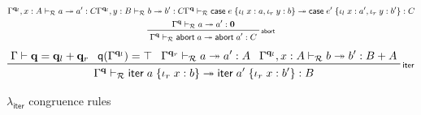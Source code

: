 \documentclass[acmsmall,screen,review]{acmart}
\newcommand{\mc}[1]{\ensuremath{\mathcal{#1}}}
\newcommand{\mb}[1]{\ensuremath{\mathbf{#1}}}
\newcommand{\ms}[1]{\ensuremath{\mathsf{#1}}}
\newcommand{\lto}{:}
\newcommand{\linl}[1]{\iota_l\;{#1}}
\newcommand{\linr}[1]{\iota_r\;{#1}}
\newcommand{\labort}[1]{\ms{abort}\;{#1}}
\newcommand{\caseexpr}[5]{\ms{case}\;#1\;\{\linl{#2} \lto #3, \linr{#4} \lto #5\}}
\newcommand{\liter}[3]{\ms{iter}\;#1\;\{ \linr{#2} \lto #3 \}}
\newcommand{\qsp}[4]{#1 \vdash #2 = #3 + #4}
\newcommand{\rle}[1]{{\scriptsize\textsf{#1}}}
\newcommand{\tref}{\twoheadrightarrow}
\newcommand{\tmle}[5]{#1 \vdash_{#2} #3 \tref #4 : {#5}}
\newcommand{\subiterexp}{\(\lambda_{\ms{iter}}\)}
\newcommand{\alquant}{\ms{q}}
\begin{document}
\begin{figure}
\begin{gather*}
      {\tmle{\Gamma^{\mb{q}_l}, x : A}{\mc{R}}{a}{a'}{C}}
      {\tmle{\Gamma^{\mb{q}_l}, y : B}{\mc{R}}{b}{b'}{C}}
      {\tmle{\Gamma^{\mb{q}}}{\mc{R}}
        {\caseexpr{e}{x}{a}{y}{b}}{\caseexpr{e'}{x}{a'}{y}{b'}}{C}} \\
    \prftree[r]{\rle{abort}}
      {\tmle{\Gamma^{\mb{q}}}{\mc{R}}{a}{a'}{\mb{0}}}
      {\tmle{\Gamma^{\mb{q}}}{\mc{R}}{\labort{a}}{\labort{a'}}{C}}
  \end{gather*}
  \begin{gather*}
    \prftree[r]{\rle{iter}}
      {\qsp{\Gamma}{\mb{q}}{\mb{q}_l}{\mb{q}_r}}
      {\alquant(\Gamma^{\mb{q}_l}) = \top}
      {\tmle{\Gamma^{\mb{q}_r}}{\mc{R}}{a}{a'}{A}}
      {\tmle{\Gamma^{\mb{q}_l}, x : A}{\mc{R}}{b}{b'}{B + A}}
      {\tmle{\Gamma^{\mb{q}}}{\mc{R}}{\liter{a}{x}{b}}{\liter{a'}{x}{b'}}{B}}
  \end{gather*}
  \caption{\subiterexp{} congruence rules}
  \Description{}
  \label{fig:congruence-refinement}
\end{figure}
\end{document}
